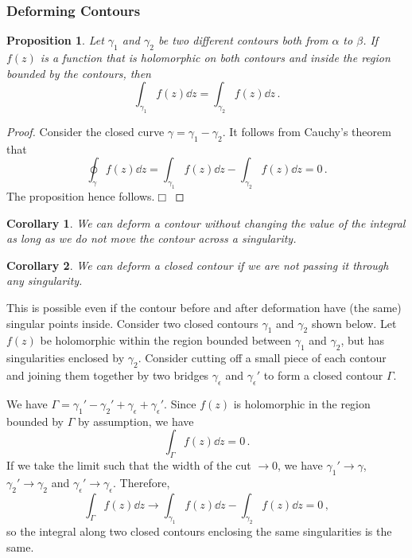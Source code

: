 \documentclass{article}
\theoremstyle{plain}\theoremheaderfont{\normalfont\itshape}\theorembodyfont{\rmfamily}\theoremseparator{.}\newtheorem*{rem}{Remark}\newtheorem*{ex}{Example}\newtheorem*{proof}{Proof}\newtheorem*{altp}{Alternative proof}
\theoremstyle{plain}\theoremheaderfont{\normalfont\bfseries}\theorembodyfont{\rmfamily}\theoremseparator{.}\newtheorem{thm}{Theorem}[section]\newtheorem{lem}[thm]{Lemma}\newtheorem{prop}[thm]{Proposition}\newtheorem*{cor}{Corollary}\newtheorem{defn}[thm]{Definition}\newtheorem{clm}[thm]{Claim}\newtheorem{clminproof}{Claim}
\theoremstyle{break}\theoremheaderfont{\normalfont\itshape}\theorembodyfont{\rmfamily}\theoremseparator{.\medskip}\newtheorem*{proofskip}{Proof}\newtheorem*{exs}{Examples}\newtheorem*{rems}{Remarks}
\theoremstyle{break}\theoremheaderfont{\normalfont\bfseries}\theorembodyfont{\rmfamily}\theoremseparator{.\medskip}\newtheorem{lemskip}[thm]{Lemma}\newtheorem{defnskip}[thm]{Definition}\newtheorem{propskip}[thm]{Proposition}\newtheorem{thmskip}[thm]{Theorem}
\numberwithin{equation}{section}
\newcommand{\qed}{\hfill\ensuremath{\Box}}
\begin{document}
	\subsubsection{Deforming Contours}
	\begin{prop}
		Let \(\gamma_1\) and \(\gamma_2\) be two different contours both from \(\alpha\) to \(\beta\). If \(f(z)\) is a function that is holomorphic on both contours and inside the region bounded by the contours, then
		\[\int_{\gamma_1}f(z)\dd{z}=\int_{\gamma_2}f(z)\dd{z}\,.\]
	\end{prop}
	\begin{proof}
		Consider the closed curve \(\gamma=\gamma_1-\gamma_2\). It follows from Cauchy's theorem that
		\[\oint_\gamma f(z)\dd{z}=\int_{\gamma_1}f(z)\dd{z}-\int_{\gamma_2}f(z)\dd{z}=0\,.\]
		The proposition hence follows.\qed
	\end{proof}
	\begin{cor}
		We can deform a contour without changing the value of the integral as long as we do not move the contour across a singularity.
	\end{cor}
	\begin{cor}
		We can deform a closed contour if we are not passing it through any singularity.
	\end{cor}
	This is possible even if the contour before and after deformation have (the same) singular points inside. Consider two closed contours \(\gamma_1\) and \(\gamma_2\) shown below. Let \(f(z)\) be holomorphic within the region bounded between \(\gamma_1\) and \(\gamma_2\), but has singularities enclosed by \(\gamma_2\). Consider cutting off a small piece of each contour and joining them together by two bridges \(\gamma_\epsilon\) and \(\gamma_\epsilon'\) to form a closed contour \(\Gamma\).

	We have \(\Gamma=\gamma_1'-\gamma_2'+\gamma_\epsilon+\gamma_\epsilon'\). Since \(f(z)\) is holomorphic in the region bounded by \(\Gamma\) by assumption, we have
	\[\int_\Gamma f(z)\dd{z}=0\,.\]
	If we take the limit such that the width of the cut \(\to 0\), we have \(\gamma_1'\to\gamma\), \(\gamma_2'\to\gamma_2\) and \(\gamma_\epsilon'\to\gamma_\epsilon\). Therefore,
	\[\int_\Gamma f(z)\dd{z}\to\int_{\gamma_1}f(z)\dd{z}-\int_{\gamma_2}f(z)\dd{z}=0\,,\]
	so the integral along two closed contours enclosing the same singularities is the same.
\end{document}

